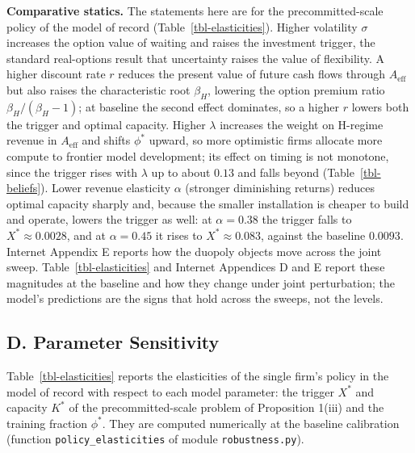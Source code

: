 \documentclass[
  11pt,
  letterpaper,
]{scrartcl}
\begin{document}
\textbf{Comparative statics.} The statements here are for the
precommitted-scale policy of the model of record
(Table~\ref{tbl-elasticities}). Higher volatility \(\sigma\) increases
the option value of waiting and raises the investment trigger, the
standard real-options result that uncertainty raises the value of
flexibility. A higher discount rate \(r\) reduces the present value of
future cash flows through \(A_{\text{eff}}\) but also raises the
characteristic root \(\beta_H\), lowering the option premium ratio
\(\beta_H/(\beta_H - 1)\); at baseline the second effect dominates, so a
higher \(r\) lowers both the trigger and optimal capacity. Higher
\(\lambda\) increases the weight on H-regime revenue in
\(A_{\text{eff}}\) and shifts \(\phi^*\) upward, so more optimistic
firms allocate more compute to frontier model development; its effect on
timing is not monotone, since the trigger rises with \(\lambda\) up to
about \(0.13\) and falls beyond (Table~\ref{tbl-beliefs}). Lower revenue
elasticity \(\alpha\) (stronger diminishing returns) reduces optimal
capacity sharply and, because the smaller installation is cheaper to
build and operate, lowers the trigger as well: at \(\alpha = 0.38\) the
trigger falls to \(X^* \approx 0.0028\), and at \(\alpha = 0.45\) it
rises to \(X^* \approx 0.083\), against the baseline \(0.0093\).
Internet Appendix E reports how the duopoly objects move across the
joint sweep. Table~\ref{tbl-elasticities} and Internet Appendices D and
E report these magnitudes at the baseline and how they change under
joint perturbation; the model's predictions are the signs that hold
across the sweeps, not the levels.

\subsection*{D. Parameter Sensitivity}\label{d.-parameter-sensitivity}

Table~\ref{tbl-elasticities} reports the elasticities of the single
firm's policy in the model of record with respect to each model
parameter: the trigger \(X^*\) and capacity \(K^*\) of the
precommitted-scale problem of Proposition 1(iii) and the training
fraction \(\phi^*\). They are computed numerically at the baseline
calibration (function \texttt{policy\_elasticities} of module
\texttt{robustness.py}).
\end{document}
